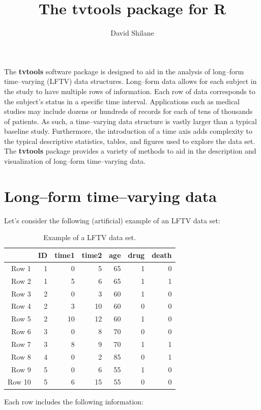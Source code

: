 \documentclass{article}
\begin{document}
\title{The \textbf{tvtools} package for R}
\author{David Shilane}
\maketitle

\noindent The \textbf{tvtools} software package is designed to aid in the analysis of long--form time--varying (LFTV) data structures.  Long--form data allows for each subject in the study to have multiple rows of information.  Each row of data corresponds to the subject's status in a specific time interval.  Applications such as medical studies may include dozens or hundreds of records for each of tens of thousands of patients.  As such, a time--varying data structure is vastly larger than a typical baseline study.  Furthermore, the introduction of a time axis adds complexity to the typical descriptive statistics, tables, and figures used to explore the data set.  The \textbf{tvtools} package provides a variety of methods to aid in the description and visualization of long--form time--varying data.

\section{Long--form time--varying data}

Let's consider the following (artificial) example of an LFTV data set:

\begin{table}[ht]
\begin{center}
\begin{tabular}{rrrrrrr}
  \hline
 & ID & time1 & time2 & age & drug & death \\ 
  \hline
Row 1 & 1 & 0 & 5 & 65 & 1 & 0 \\ 
  Row 2 & 1 & 5 & 6 & 65 & 1 & 1 \\ 
  Row 3 & 2 & 0 & 3 & 60 & 1 & 0 \\ 
  Row 4 & 2 & 3 & 10 & 60 & 0 & 0 \\ 
  Row 5 & 2 & 10 & 12 & 60 & 1 & 0 \\ 
  Row 6 & 3 & 0 & 8 & 70 & 0 & 0 \\ 
  Row 7 & 3 & 8 & 9 & 70 & 1 & 1 \\ 
  Row 8 & 4 & 0 & 2 & 85 & 0 & 1 \\ 
  Row 9 & 5 & 0 & 6 & 55 & 1 & 0 \\ 
  Row 10 & 5 & 6 & 15 & 55 & 0 & 0 \\ 
   \hline
\end{tabular}
\caption{Example of a LFTV data set.}
\label{ex1}
\end{center}
\end{table}
\noindent Each row includes the following information:
\end{document}
